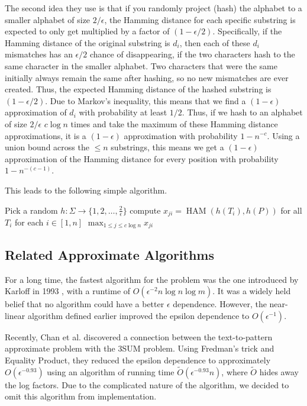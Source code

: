\documentclass{article}
\theoremstyle{definition}
\newcommand{\op}{\operatorname}
\newcommand{\eps}{\epsilon}
\begin{document}
The second idea they use is that if you randomly project (hash) the alphabet to a smaller alphabet of size $2/\eps$, the Hamming distance for each specific substring is expected to only get multiplied by a factor of $(1 - \eps/2)$.
Specifically, if the Hamming distance of the original substring is $d_i$, then each of these $d_i$ mismatches has an $\eps/2$ chance of disappearing, if the two characters hash to the same character in the smaller alphabet.
Two characters that were the same initially always remain the same after hashing, so no new mismatches are ever created.
Thus, the expected Hamming distance of the hashed substring is $(1 - \eps/2)$.
Due to Markov's inequality, this means that we find a $(1 - \eps)$ approximation of $d_i$ with probability at least $1/2$.
Thus, if we hash to an alphabet of size $2/\eps$ $c \log n$ times and take the maximum of these Hamming distance approximations, it is a $(1 - \eps)$ approximation with probability $1 - n^{-c}$.
Using a union bound across the $\le n$ substrings, this means we get a $(1 - \eps)$ approximation of the Hamming distance for every position with probability $1 - n^{-(c-1)}$.

This leads to the following simple algorithm.
\begin{algorithm} 
\caption{Simple near-linear algorithm: KP Projection}
\label{alg:fft_sample}
\begin{algorithmic}
    \State Pick a random $h : \Sigma \to  \{1, 2, \dots, \frac{2}{\epsilon}\}$
    \State compute $x_{ji} = \op{HAM}(h(T_i), h(P))$ for all $T_i$
\EndFor
\State \Return for each $i \in [1, n]$ $\max_{1 \le j \le c \log n} x_{ji}$
\end{algorithmic}
\end{algorithm}


\subsection{Related Approximate Algorithms}

For a long time, the fastest algorithm for the problem was the one introduced by Karloff in 1993 \cite{karloff93}, with a runtime of $O(\eps^{-2}n \log n\log m)$. It was a widely held belief that no algorithm could have a better $\eps$ dependence.
However, the near-linear algorithm defined earlier improved the epsilon dependence to $O(\eps^{-1})$. 

Recently, Chan et al. \cite{chan2024} discovered a connection between the text-to-pattern approximate problem with the 3SUM problem.
Using Fredman's trick and Equality Product, they reduced the epsilon dependence to approximately $O(\eps^{-0.93})$ using an algorithm of running time $\tilde{O}(\epsilon^{-0.93}n)$, where $\tilde{O}$ hides away the log factors.
Due to the complicated nature of the algorithm, we decided to omit this algorithm from implementation.
\end{document}
